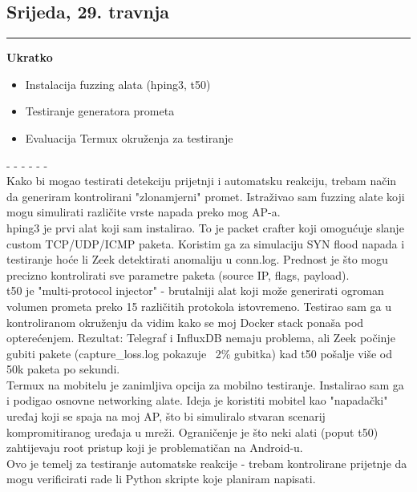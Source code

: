 \documentclass[12pt, a4paper]{article}
\newcommand{\dan}[1]{
    \subsection*{#1}
    \vspace{-0.5em} 
    \hrule \vspace{0.5em} 
}
\begin{document}
\dan{Srijeda, 29. travnja}
\textbf{Ukratko}
\begin{itemize}
    \item Instalacija fuzzing alata (hping3, t50)
    \item Testiranje generatora prometa
    \item Evaluacija Termux okruženja za testiranje
\end{itemize}
- - - - - - \\
Kako bi mogao testirati detekciju prijetnji i automatsku reakciju, trebam način da generiram kontrolirani "zlonamjerni" promet. Istraživao sam fuzzing alate koji mogu simulirati različite vrste napada preko mog AP-a.
\\
hping3 je prvi alat koji sam instalirao. To je packet crafter koji omogućuje slanje custom TCP/UDP/ICMP paketa. Koristim ga za simulaciju SYN flood napada i testiranje hoće li Zeek detektirati anomaliju u conn.log. Prednost je što mogu precizno kontrolirati sve parametre paketa (source IP, flags, payload).
\\
t50 je "multi-protocol injector" - brutalniji alat koji može generirati ogroman volumen prometa preko 15 različitih protokola istovremeno. Testirao sam ga u kontroliranom okruženju da vidim kako se moj Docker stack ponaša pod opterećenjem. Rezultat: Telegraf i InfluxDB nemaju problema, ali Zeek počinje gubiti pakete (capture\_loss.log pokazuje ~2\% gubitka) kad t50 pošalje više od 50k paketa po sekundi.
\\
Termux na mobitelu je zanimljiva opcija za mobilno testiranje. Instalirao sam ga i podigao osnovne networking alate. Ideja je koristiti mobitel kao "napadački" uređaj koji se spaja na moj AP, što bi simuliralo stvaran scenarij kompromitiranog uređaja u mreži. Ograničenje je što neki alati (poput t50) zahtijevaju root pristup koji je problematičan na Android-u.
\\
Ovo je temelj za testiranje automatske reakcije - trebam kontrolirane prijetnje da mogu verificirati rade li Python skripte koje planiram napisati.
\end{document}
